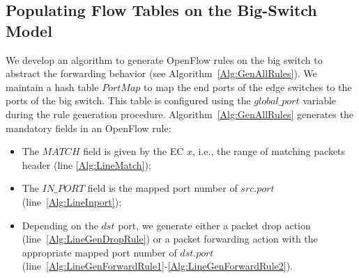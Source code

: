 \subsection{Populating Flow Tables on the Big-Switch Model}\label{sec:thirdstep}


We develop an algorithm to generate OpenFlow rules on the big switch to abstract the forwarding behavior (see Algorithm~\ref{Alg:GenAllRules}).
We maintain a hash table $PortMap$ to map the end ports of the edge switches to the ports of the big switch.
This table is configured using the $global\_port$ variable during the rule generation procedure.
Algorithm~\ref{Alg:GenAllRules} generates the mandatory fields in an OpenFlow rule:
\begin{itemize}
\item The $MATCH$ field is given by the EC $x$, i.e., the range of matching packets header (line \ref{Alg:LineMatch});
\item The $IN\_PORT$ field is the mapped port number of $src.port$ (line~\ref{Alg:LineInport});
\item Depending on the $dst$ port, we generate either a packet drop action (line~\ref{Alg:LineGenDropRule}) or a packet forwarding action with the appropriate mapped port number of $dst.port$ (line~\ref{Alg:LineGenForwardRule1}-\ref{Alg:LineGenForwardRule2}).
\end{itemize}
